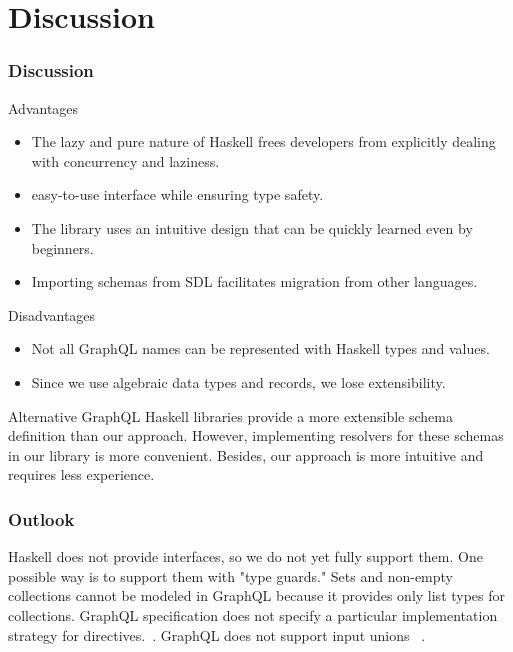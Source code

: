 \section{Discussion}

    
\begin{frame}[allowframebreaks]\frametitle{Discussion}

\begin{block}{Advantages}
\begin{itemize}
    \item The lazy and pure nature of Haskell frees developers from explicitly dealing with concurrency and laziness.
    \item easy-to-use interface while ensuring type safety.
    \item The library uses an intuitive design that can be quickly learned even by beginners.
    \item Importing schemas from SDL facilitates migration from other languages.
\end{itemize}
\end{block}

\begin{block}{Disadvantages}
\begin{itemize}
    \item Not all GraphQL names can be represented with Haskell types and values.
    \item Since we use algebraic data types and records, we lose extensibility.
\end{itemize}
\end{block}

\vspace{40pt}

Alternative GraphQL Haskell libraries provide a more extensible schema definition than our approach. However, implementing resolvers for these schemas in our library is more convenient. Besides, our approach is more intuitive and requires less experience.
    
\end{frame}

\begin{frame}\frametitle{Outlook}

\begin{itemize}
      Haskell does not provide interfaces, so we do not yet fully support them. One possible way is to support them with "type guards." 
     Sets and non-empty collections cannot be modeled in GraphQL because it provides only list types for collections.
     GraphQL specification does not specify a particular implementation strategy for directives.~\cite{schema-directives}.
     GraphQL does not support input unions ~\cite{gql-spec-input-unions}.

\end{itemize}

\end{frame}